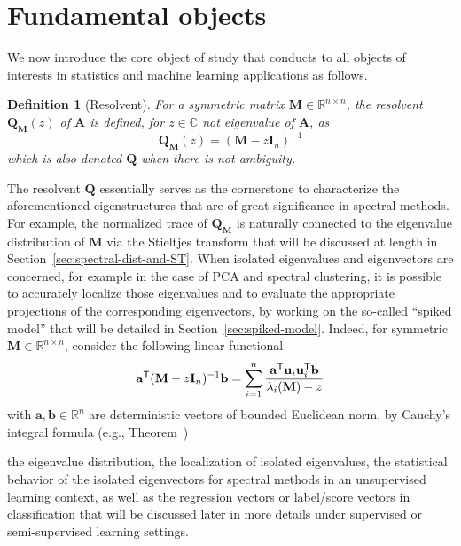 \documentclass[MAL,biber]{nowfnt} %
\newtheorem{Definition}{Definition}
\newcommand{\eg}{\emph{e.g.}}
\newcommand{\T}{{\sf T}}
\newcommand{\A}{{\mathbf{A}}}
\newcommand{\I}{{\mathbf{I}}}
\newcommand{\M}{{\mathbf{M}}}
\newcommand{\Q}{{\mathbf{Q}}}
\newcommand{\uu}{{\mathbf{u}}}
\newcommand{\RR}{{\mathbb{R}}}
\newcommand{\CC}{{\mathbb{C}}}
\begin{document}
\section{Fundamental objects}

We now introduce the core object of study that conducts to all objects of interests in statistics and machine learning applications as follows.
\begin{Definition}[Resolvent]\label{def:resolvent}
For a symmetric matrix $\M \in \RR^{n \times n}$, the resolvent $\Q_\M(z)$ of $\A$ is defined, for $z \in \CC$ not eigenvalue of $\A$, as
\begin{equation}\label{eq:def-resolvent}
    \Q_\M(z) = \left( \M - z \I_n \right)^{-1}
\end{equation}
which is also denoted $\Q$ when there is not ambiguity.
\end{Definition}


The resolvent $\Q$ essentially serves as the cornerstone to characterize the aforementioned eigenstructures that are of great significance in spectral methods. For example, the normalized trace of $\Q_\M$ is naturally connected to the eigenvalue distribution of $\M$ via the Stieltjes transform that will be discussed at length in Section~\ref{sec:spectral-dist-and-ST}. When isolated eigenvalues and eigenvectors are concerned, for example in the case of PCA and spectral clustering, it is possible to accurately localize those eigenvalues and to evaluate the appropriate projections of the corresponding eigenvectors, by working on the so-called ``spiked model'' that will be detailed in Section~\ref{sec:spiked-model}. Indeed, for symmetric $\M \in \RR^{n \times n}$, consider the following linear functional
\begin{equation}
    \mathbf{a}^\T (\M - z \I_n)^{-1} \mathbf{b} = \sum_{i=1}^n \frac{\mathbf{a}^\T \uu_i \uu_i^\T \mathbf{b}}{\lambda_i(\M) - z}
\end{equation}
with $\mathbf{a}, \mathbf{b}\in \RR^n$ are deterministic vectors of bounded Euclidean norm, by Cauchy's integral formula (e.g., Theorem~)


the eigenvalue distribution, the localization of isolated eigenvalues, the statistical behavior of the isolated eigenvectors for spectral methods in an unsupervised learning context, as well as the regression vectors or label/score vectors in classification that will be discussed later in more details under supervised or semi-supervised learning settings.
\end{document}
